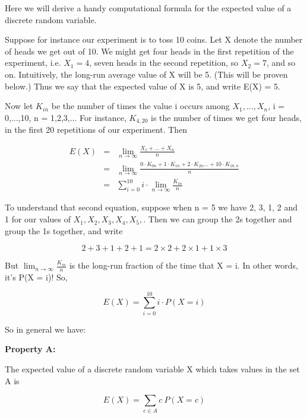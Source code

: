 Here we will derive a handy computational formula for the expected value
of a discrete random variable.

Suppose for instance our experiment is to toss 10 coins.  Let X denote
the number of heads we get out of 10.  We might get four heads in the
first repetition of the experiment, i.e. $X_1 = 4$, seven heads in the
second repetition, so $X_2 = 7$, and so on.  Intuitively, the long-run
average value of X will be 5.  (This will be proven below.) Thus we say
that the expected value of X is 5, and write E(X) = 5.

Now let $K_{in}$ be the number of times the value i occurs among
$X_1,...,X_n$, i = 0,...,10, n = 1,2,3,...  For instance, $K_{4,20}$ is
the number of times we get four heads, in the first 20 repetitions of
our experiment.  Then

\begin{eqnarray}
E(X) &=& \lim_{n \rightarrow \infty} \frac{X_1+...+X_n}{n} \\
&=& \lim_{n \rightarrow \infty} \frac{0 \cdot K_{0n}+1 \cdot K_{1n}+2 \cdot
K_{2n}...+10 \cdot K_{10,n}}{n} \\
&=& \sum_{i=0}^{10} i \cdot \lim_{n \rightarrow \infty} \frac{K_{in}}{n}
\end{eqnarray}

To understand that second equation, suppose when n = 5 we have
2, 3, 1, 2 and 1 for our values of $X_1,X_2,X_3,X_4,X_5,$.  Then we can
group the 2s together and group the 1s together, and write

\begin{equation}
2 +3 + 1 + 2 + 1 = 2 \times 2 + 2 \times 1 + 1 \times 3
\end{equation}

But $\lim_{n \rightarrow \infty} \frac{K_{in}}{n}$ is the long-run
fraction of the time that X = i.  In other words, it's P(X = i)!
So,

\begin{equation}
E(X) = \sum_{i=0}^{10} i \cdot P(X = i)
\end{equation}

So in general we have: 

{\bf Property A:} 

The expected value of a discrete random variable X which takes values in
the set A is 

\begin{equation}
\label{a}
E(X) = \sum_{c \in A} c ~ P(X = c)
\end{equation}


